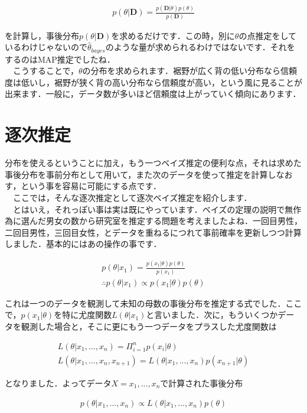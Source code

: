 \documentclass[11pt,a4paper]{ujreport} 	%
\begin{document}
\begin{align}
p(\theta|\mathbf{D}) = \frac{p(\mathbf{D}|\theta) p(\theta)}{p(\mathbf{D})}
\end{align}

を計算し，事後分布$p(\theta|\mathbf{D})$を求めるだけです．この時，別に$\theta$の点推定をしているわけじゃないので$\hat \theta_{bayes}$のような量が求められるわけではないです．それをするのはMAP推定でしたね．\\
　こうすることで，$\theta$の分布を求められます．裾野が広く背の低い分布なら信頼度は低いし，裾野が狭く背の高い分布なら信頼度が高い，という風に見ることが出来ます．一般に，データ数が多いほど信頼度は上がっていく傾向にあります．

\section{逐次推定}
分布を使えるということに加え，もう一つベイズ推定の便利な点，それは求めた事後分布を事前分布として用いて，また次のデータを使って推定を計算しなおす，という事を容易に可能にする点です．\\
　ここでは，そんな逐次推定として逐次ベイズ推定を紹介します．\\
　とはいえ，それっぽい事は実は既にやっています．ベイズの定理の説明で無作為に選んだ男女の数から研究室を推定する問題を考えましたよね．一回目男性，二回目男性，三回目女性，とデータを重ねるにつれて事前確率を更新しつつ計算しました．基本的にはあの操作の事です．

\begin{align}
p(\theta|x_1) = \frac{p(x_1|\theta)p(\theta)}{p(x_1)} \nonumber \\
\therefore p(\theta|x_1) \propto p(x_1|\theta)p(\theta)
\end{align}

これは一つのデータを観測して未知の母数の事後分布を推定する式でした．ここで，$p(x_1|\theta)$を特に尤度関数$L(\theta|x_1)$と言いました．次に，もういくつかデータを観測した場合と，そこに更にもう一つデータをプラスした尤度関数は

\begin{align}
L(\theta|x_1,... ,x_n) = \Pi_{i=1}^{n} p(x_i | \theta)\\
L(\theta|x_1,... ,x_n, x_{n+1}) = L(\theta|x_1,... ,x_n) p(x_{n+1} |\theta)
\end{align}

となりました．よってデータ$X=x_1,...,x_n$で計算された事後分布


\begin{align}
p(\theta|x_1, ..., x_{n}) \propto L(\theta|x_1, ..., x_{n})p(\theta)\\
\end{align}
\end{document}
